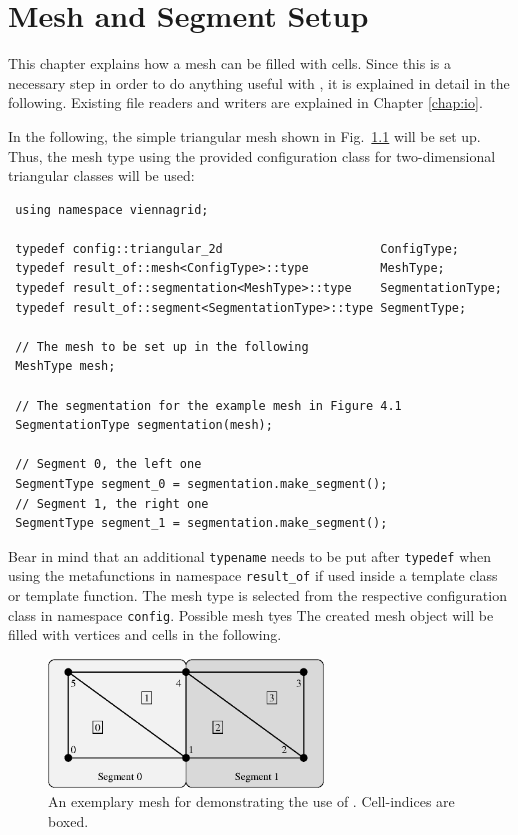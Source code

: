 \chapter{Mesh and Segment Setup} \label{chap:meshsetup}

This chapter explains how a {\ViennaGrid} mesh can be filled with cells. Since this
is a necessary step in order to do anything useful with {\ViennaGrid}, it is explained in detail in the following.
Existing file readers and writers are explained in Chapter \ref{chap:io}.


In the following, the simple triangular mesh shown in Fig.~\ref{fig:samplemesh} will be set up.
Thus, the mesh type using the provided configuration class for two-dimensional triangular classes will be used:
\begin{lstlisting}
 using namespace viennagrid;

 typedef config::triangular_2d                      ConfigType;
 typedef result_of::mesh<ConfigType>::type          MeshType;
 typedef result_of::segmentation<MeshType>::type    SegmentationType;
 typedef result_of::segment<SegmentationType>::type SegmentType;

 // The mesh to be set up in the following
 MeshType mesh;

 // The segmentation for the example mesh in Figure 4.1
 SegmentationType segmentation(mesh);

 // Segment 0, the left one
 SegmentType segment_0 = segmentation.make_segment();
 // Segment 1, the right one
 SegmentType segment_1 = segmentation.make_segment();
\end{lstlisting}
Bear in mind that an additional \lstinline|typename| needs to be put after \lstinline|typedef| when using the metafunctions in namespace \texttt{result\_of} if used inside a template class or template function.
The mesh type is selected from the respective configuration class in namespace \texttt{config}.
Possible mesh tyes 
The created mesh object will be filled with vertices and cells in the following.

\begin{figure}[tb]
\centering
 \includegraphics[width=0.65\textwidth]{figures/samplemesh.eps}
 \caption{An exemplary mesh for demonstrating the use of {\ViennaGrid}. Cell-indices are boxed.}
 \label{fig:samplemesh}
\end{figure}

